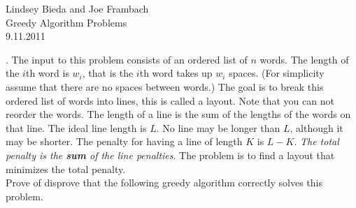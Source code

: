 \documentclass[10pt]{article}
\begin{document}
	\begin{flushright}
	Lindsey Bieda and Joe Frambach\\
	Greedy Algorithm Problems\\
	9.11.2011
	\end{flushright}
	.  The input to this problem consists of an ordered list of $n$ words. The length of the $i$th word is $w_{i}$, that
			is the $i$th word takes up $w_{i}$ spaces.  (For simplicity assume that there are no spaces between words.)
			The goal is to break this ordered list of words into lines, this is called a layout. Note that you can not
			reorder the words.  The length of a line is the sum of the lengths of the words on that line. The ideal
			line length is $L$. No line may be longer than $L$, although it may be shorter.  The penalty for having a
			line of length $K$ is $L - K$. \textit{The total penalty is the \textbf{sum} of the line penalties}. The problem is to find a
			layout that minimizes the total penalty.\\
			Prove of disprove that the following greedy algorithm correctly solves this problem.
			
\end{document}
